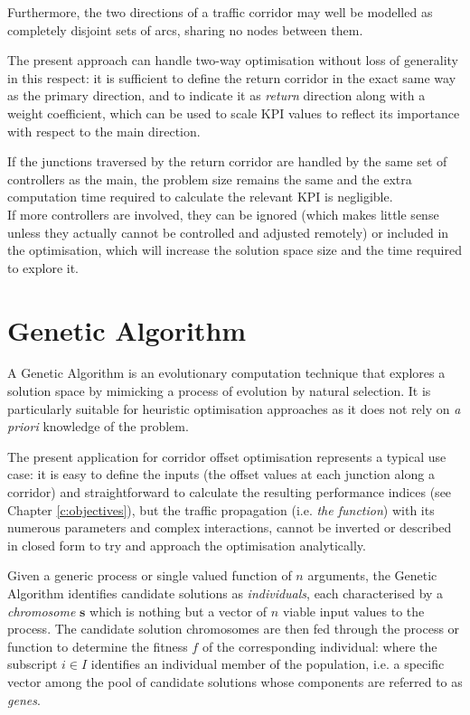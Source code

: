 Furthermore, the two directions of a traffic corridor may well be modelled as completely disjoint sets of arcs, sharing no nodes between them.

The present approach can handle two-way optimisation without loss of generality in this respect: it is sufficient to define the return corridor in the exact same way as the primary direction, and to indicate it as \emph{return} direction along with a weight coefficient, which can be used to scale KPI values to reflect its importance with respect to the main direction.

If the junctions traversed by the return corridor are handled by the same set of controllers as the main, the problem size remains the same and the extra computation time required to calculate the relevant KPI is negligible. \\
If more controllers are involved, they can be ignored (which makes little sense unless they actually cannot be controlled and adjusted remotely) or included in the optimisation, which will increase the solution space size and the time required to explore it.


\section{Genetic Algorithm} \label{s:geneticalgo}
\newcommand{\solution}{\mathbf{s}}
A Genetic Algorithm is an evolutionary computation technique that explores a solution space by mimicking a process of evolution by natural selection. It is particularly suitable for heuristic optimisation approaches as it does not rely on \emph{a priori} knowledge of the problem.

The present application for corridor offset optimisation represents a typical use case: it is easy to define the inputs (the offset values at each junction along a corridor) and straightforward to calculate the resulting performance indices (see Chapter \ref{c:objectives}), but the traffic propagation (i.e. \emph{the function}) with its numerous parameters and complex interactions, cannot be inverted or described in closed form to try and approach the optimisation analytically. 

Given a generic process or single valued function of $n$ arguments, the Genetic Algorithm identifies candidate solutions as \emph{individuals}, each characterised by a \emph{chromosome} $\solution$ which is nothing but a vector of $n$ viable input values to the process. The candidate solution chromosomes are then fed through the process or function to determine the fitness $f$ of the corresponding individual:
\eq{e:gafitness}{
\omega_i = \phi(\solution_i)\qquad \mathrm{with} \quad 
\solution_i = \left\lbrace s_i^1, s_i^2, \dots s_i^n\right\rbrace
}
where the subscript $i \in I$ identifies an individual member of the population, i.e. a specific vector among the pool of candidate solutions whose components are referred to as \emph{genes}.

